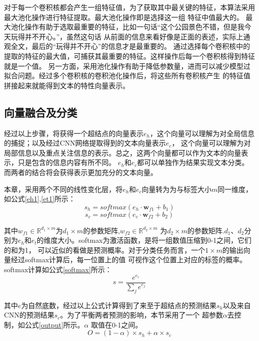 对于每一个卷积核都会产生一组特征值，为了获取其中最关键的特征，本算法采用最大池化操作进行特征提取。最大池化操作即是选择这一组
特征中值最大的。
最大池化操作有助于选取最重要的特征，比如一句话“这个公园景色不错，但是我今天玩得并不开心。”，虽然这句话
从前面的信息来看好像是正面的表述，实际上通观全文，最后的“玩得并不开心”的信息才是最重要的。
通过选择每个卷积核中的提取的特征的最大值，可捕获其最重要的特征。这样操作后每一个卷积核得到特征就是一个值。
另一方面，采用池化操作有助于降低参数量，进而可以减少模型过拟合问题。经过多个卷积核的卷积池化操作后，将这些所有卷积核产生
的特征值拼接起来就能得到文本的特性向量表示。

\subsection{向量融合及分类}
经过以上步骤，将获得一个超结点的向量表示$e_h$，这个向量可以理解为对全局信息的捕捉；以及经过CNN网络提取得到的文本向量表示$e_c$，
这个向量可以理解为对局部信息以及重点关注信息的表示。总之，这两个向量都可以作为文本的向量表示，只是包含的信息内容有所不同。
$e_h$和$e_c$都可以单独作为结果实现文本分类。而两者的结合将会获得表示更加充分的文本向量。

本章，采用两个不同的线性变化层，将$e_h$和$e_c$向量转为为与标签大小$m$同一维度，如公式\ref{eh1},\ref{et1}所示：
\begin{equation}\label{eh1}
    s_h=softmax(e_h \cdot \mathbf{w}_{f1}+b_1)
\end{equation}
\begin{equation}\label{et1}
    s_c=softmax(e_c \cdot \mathbf{w}_{f2}+b_2)
\end{equation}

其中$w_{f1}\in \mathbb{R}^{d_1 \times m}$为$d_1\times m$的参数矩阵,$w_{f2}\in \mathbb{R}^{d_2 \times m}$
为$d_2\times m$的参数矩阵.$d_1$、$d_2$分别为$e_h$和$e_t$的维度大小。softmax为激活函数，是将一组数值压缩到0-1之间，它们的和为1，
可以近似的看做是预测概率。对于分类任务而言，一个$1\times m$的输出向量经过softmax计算后，每一位置上的值
可视作这个位置上对应的标签的概率。softmax计算如公式\ref{softmax}所示：
\begin{equation}\label{softmax}
    s=\frac{e^{e_i}}{\sum\limits_{j}{e^{e_j}}}
\end{equation}

其中$e$为自然底数，经过以上公式计算得到了来至于超结点的预测结果$s_h$以及来自CNN的预测结果$s_c$。为了平衡两者预测的影响，本节采用了一个
超参数$\alpha$去控制，如公式\ref{output}所示。$\alpha$ 取值在0-1之间。
\begin{equation}\label{output}
    O=(1-\alpha) \times s_h+\alpha \times s_c
\end{equation}

